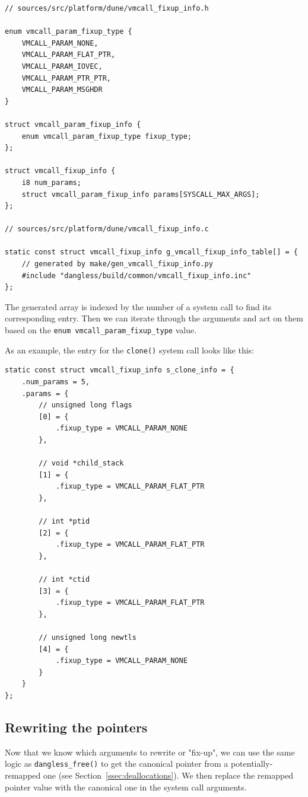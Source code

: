 \begin{lstlisting}
// sources/src/platform/dune/vmcall_fixup_info.h

enum vmcall_param_fixup_type {
	VMCALL_PARAM_NONE,
	VMCALL_PARAM_FLAT_PTR,
	VMCALL_PARAM_IOVEC,
	VMCALL_PARAM_PTR_PTR,
	VMCALL_PARAM_MSGHDR
}

struct vmcall_param_fixup_info {
	enum vmcall_param_fixup_type fixup_type;
};

struct vmcall_fixup_info {
	i8 num_params;
	struct vmcall_param_fixup_info params[SYSCALL_MAX_ARGS];
};

// sources/src/platform/dune/vmcall_fixup_info.c

static const struct vmcall_fixup_info g_vmcall_fixup_info_table[] = {
	// generated by make/gen_vmcall_fixup_info.py
	#include "dangless/build/common/vmcall_fixup_info.inc"
};
\end{lstlisting}

The generated array is indexed by the number of a system call to find its corresponding entry. Then we can iterate through the arguments and act on them based on the \lstinline!enum vmcall_param_fixup_type! value.

As an example, the entry for the \lstinline!clone()! system call looks like this:

\begin{lstlisting}
static const struct vmcall_fixup_info s_clone_info = {
	.num_params = 5,
	.params = {
		// unsigned long flags
		[0] = {
			.fixup_type = VMCALL_PARAM_NONE
		},
		
		// void *child_stack
		[1] = {
			.fixup_type = VMCALL_PARAM_FLAT_PTR
		},
		
		// int *ptid
		[2] = {
			.fixup_type = VMCALL_PARAM_FLAT_PTR
		},
		
		// int *ctid
		[3] = {
			.fixup_type = VMCALL_PARAM_FLAT_PTR
		},
		
		// unsigned long newtls
		[4] = {
			.fixup_type = VMCALL_PARAM_NONE
		}
	}
};
\end{lstlisting}

\subsection{Rewriting the pointers}

Now that we know which arguments to rewrite or "fix-up", we can use the same logic as \lstinline!dangless_free()! to get the canonical pointer from a potentially-remapped one (see Section~\ref{ssec:deallocations}). We then replace the remapped pointer value with the canonical one in the system call arguments.

